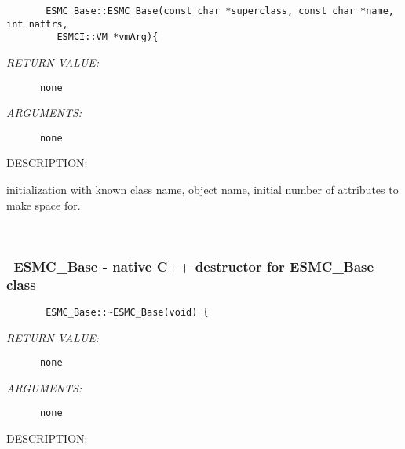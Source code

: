   
\begin{verbatim}       ESMC_Base::ESMC_Base(const char *superclass, const char *name, int nattrs,
         ESMCI::VM *vmArg){\end{verbatim}{\em RETURN VALUE:}
\begin{verbatim}      none\end{verbatim}{\em ARGUMENTS:}
\begin{verbatim}      none\end{verbatim}
{\sf DESCRIPTION:\\ }


     initialization with known class name, object name, initial number
     of attributes to make space for.
   
 
\mbox{}\hrulefill\
 
\subsubsection [~ESMC\_Base] {~ESMC\_Base - native C++ destructor for ESMC\_Base class}


  
\begin{verbatim}       ESMC_Base::~ESMC_Base(void) {\end{verbatim}{\em RETURN VALUE:}
\begin{verbatim}      none\end{verbatim}{\em ARGUMENTS:}
\begin{verbatim}      none\end{verbatim}
{\sf DESCRIPTION:\\ }


  
\setlength{\parskip}{\oldparskip}
\setlength{\parindent}{\oldparindent}
\setlength{\baselineskip}{\oldbaselineskip}
